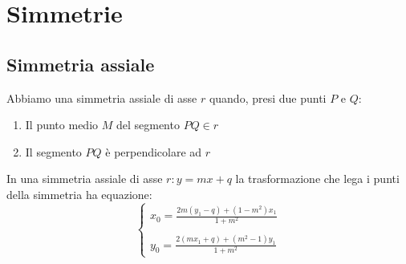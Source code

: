 
\chapter{Simmetrie}
\section{Simmetria assiale}
\begin{defn}\label{defn:Sassiale1}
Abbiamo una simmetria assiale di asse $r$ quando, presi due punti $P$ e $Q$:
\begin{enumerate}
	\item Il punto medio $M$ del segmento $PQ\in r$
	\item Il segmento $PQ$ è perpendicolare ad $r$
\end{enumerate} 
\end{defn}
\begin{thm}\label{thm:Sassiale1}
In una simmetria assiale di asse $r:y=mx+q$ la trasformazione che lega i punti della simmetria ha equazione:
\[\begin{cases}
x_0=\frac{2m(y_1-q)+(1-m^2)x_1}{1+m^2}\\
\\
y_0=\frac{2(mx_1+q)+(m^2-1)y_1}{1+m^2}
\end{cases}\]
\end{thm}
